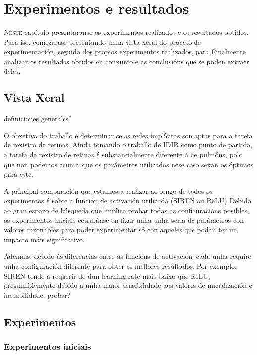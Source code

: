 \chapter{Experimentos e resultados}
\label{chap:Experimentos e resultados}
\lettrine{N}{este} capítulo presentaranse os experimentos realizados e os resultados obtidos.
Para iso, comezarase presentando unha vista xeral do proceso de experimentación, 
seguido dos propios experimentos realizados, para 
Finalmente analizar os resultados obtidos en conxunto e as conclusións que se poden extraer deles.

\section{Vista Xeral}
\label{sec:Vista Xeral}

definiciones generales?

O obxetivo do traballo é determinar se as redes implícitas son aptas para a tarefa de rexistro de retinas.
Aínda tomando o traballo de IDIR como punto de partida, a tarefa de rexistro de retinas é substancialmente diferente á de pulmóns, polo que non podemos asumir que os parámetros utilizados nese caso sexan os óptimos para este.

A principal comparación que estamos a realizar ao longo de todos os experimentos é sobre a función de activación utilizada (SIREN ou ReLU)
Debido ao gran espazo de búsqueda que implica probar todas as configuracións posibles, 
os experimentos iniciais cetraránse en fixar unha unha seria de parámetros con valores razonables para poder experimentar só con aqueles que podan ter un impacto máis significativo.

Ademais, debido ás diferencias entre as funcións de activación, cada unha require unha configuración diferente para obter os mellores resultados.
Por exemplo, SIREN tende a requerir de dun learning rate mais baixo que ReLU, presumiblemente debido a unha maior sensibilidade aos valores de inicialización e inesabilidade.
probar?

\section{Experimentos}
\label{sec:Experimentos}

\subsection{Experimentos iniciais}
\label{subsec:Experimentos iniciais}

